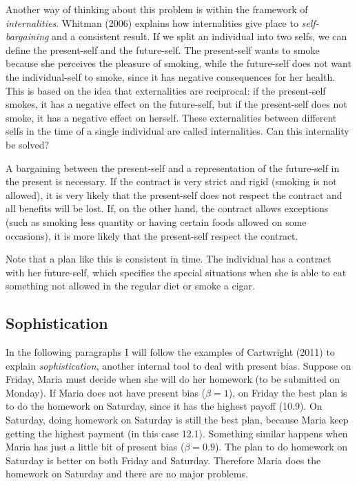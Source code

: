 \documentclass[]{article}
\begin{document}
Another way of thinking about this problem is within the framework of \emph{internalities}. Whitman (2006) explains how internalities give place to \emph{self-bargaining} and a consistent result.
If we split an individual into two selfs, we can define the present-self and the future-self. The present-self wants to smoke because she perceives the pleasure of smoking, while the future-self does not want the individual-self to smoke, since it has negative consequences for her health. This is based on the idea that externalities are reciprocal: if the present-self smokes, it has a negative effect on the future-self, but if the present-self does not smoke, it has a negative effect on herself. These externalities between different selfs in the time of a single individual are called internalities. Can this internality be solved?

A bargaining between the present-self and a representation of the future-self in the present is necessary. If the contract is very strict and rigid (smoking is not allowed), it is very likely that the present-self does not respect the contract and all benefits will be lost. If, on the other hand, the contract allows exceptions (such as smoking less quantity or having certain foods allowed on some occasions), it is more likely that the present-self respect the contract.

Note that a plan like this is consistent in time. The individual has a contract with her future-self, which specifies the special situations when she is able to eat something not allowed in the regular diet or smoke a cigar.

\hypertarget{sophistication}{%
\subsection{Sophistication}\label{sophistication}}

In the following paragraphs I will follow the examples of Cartwright (2011) to explain \emph{sophistication}, another internal tool to deal with present bias. Suppose on Friday, Maria must decide when she will do her homework (to be submitted on Monday). If Maria does not have present bias (\(\beta = 1\)), on Friday the best plan is to do the homework on Saturday, since it has the highest payoff (10.9). On Saturday, doing homework on Saturday is still the best plan, because Maria keep getting the highest payment (in this case 12.1). Something similar happens when Maria has just a little bit of present bias (\(\beta = 0.9\)). The plan to do homework on Saturday is better on both Friday and Saturday. Therefore Maria does the homework on Saturday and there are no major problems.
\end{document}
